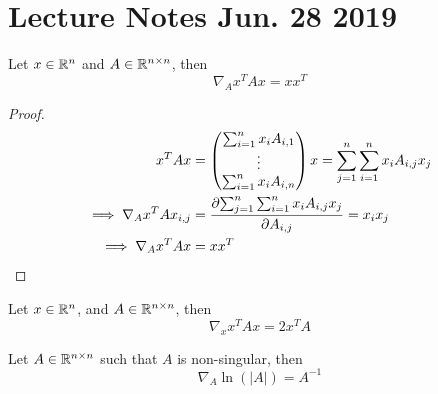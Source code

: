 \documentclass{report}
\begin{document}
    \section{Lecture Notes Jun. 28 2019}
        \begin{example}
            \begin{lemma}
                Let $x \in \mathbb{R}^n$ and $A \in \mathbb{R}^{n \times n}$, then
                \begin{equation}
                    \nabla_A x^T A x = x x^T
                \end{equation}
                \begin{proof}
                    \begin{align}
                        x^T A x &= 
                        \begin{pmatrix}
                            \sum_{i=1}^n x_i A_{i, 1} \\
                            \vdots \\
                            \sum_{i=1}^n x_i A_{i, n}
                        \end{pmatrix} x
                        = \sum_{j=1}^n \sum_{i=1}^n x_i A_{i, j} x_j \\
                        \implies \nabla_A x^T A x_{i, j} &= \frac{\partial{\sum_{j=1}^n \sum_{i=1}^n x_i A_{i, j} x_j}}{\partial{A_{i, j}}} = x_i x_j \\
                        \implies \nabla_A x^T A x &= x x^T
                    \end{align}
                \end{proof}
            \end{lemma}
            
            \begin{lemma}
                Let $x \in \mathbb{R}^n$, and $A \in \mathbb{R}^{n \times n}$, then
                \begin{equation}
                    \nabla_x x^T A x = 2 x^T A
                \end{equation}
            \end{lemma}
            
            \begin{lemma}
                Let $A \in \mathbb{R}^{n \times n}$ such that $A$ is non-singular, then
                \begin{equation}
                    \nabla_A \ln (|A|) = A^{-1}
                \end{equation}
            \end{lemma}
            

\end{example}
\end{document}
